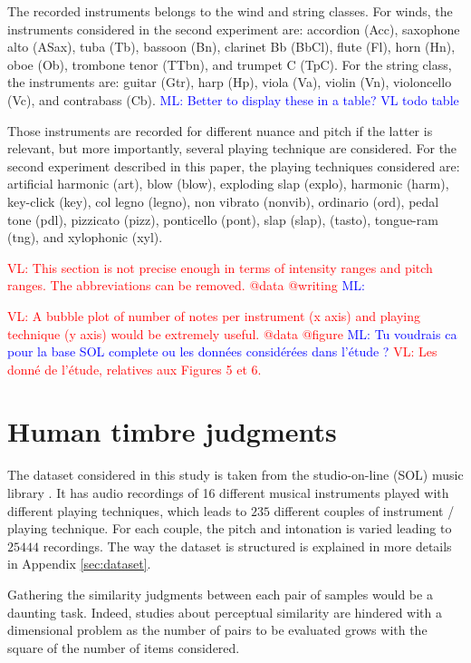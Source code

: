 \documentclass{bmcart}
\newcommand{\ml}[1]{\textcolor{blue}{ML: #1}}
\newcommand{\vl}[1]{\textcolor{red}{VL: #1}}
\begin{document}
\begin{backmatter}
The recorded instruments belongs to the wind and string classes.
For winds, the instruments considered in the second experiment are: accordion (Acc), saxophone alto (ASax), tuba (Tb), bassoon (Bn), clarinet Bb (BbCl), flute (Fl), horn (Hn), oboe (Ob), trombone tenor (TTbn), and trumpet C (TpC).
For the string class, the instruments are: guitar (Gtr), harp (Hp), viola (Va), violin (Vn), violoncello (Vc), and contrabass (Cb).
\ml{Better to display these in a table? VL todo table}

Those instruments are recorded for different nuance and pitch if the latter is relevant, but more importantly, several playing technique are considered.
For the second experiment described in this paper, the playing techniques considered are: artificial harmonic (art), blow (blow), exploding slap (explo), harmonic (harm), key-click (key), col legno (legno), non vibrato (nonvib), ordinario (ord), pedal tone (pdl), pizzicato (pizz), ponticello (pont), slap (slap), (tasto), tongue-ram (tng), and xylophonic (xyl).

\vl{This section is not precise enough in terms of intensity ranges and pitch ranges.
The abbreviations can be removed. @data @writing}
\ml{}

\vl{A bubble plot of number of notes per instrument (x axis) and playing technique
(y axis) would be extremely useful. @data @figure}
\ml{Tu voudrais ca pour la base SOL complete ou les données considérées dans l'étude ?}
\vl{Les donn\'{e} de l'\'{e}tude, relatives aux Figures 5 et 6.}

\section*{Human timbre judgments}
\label{sec:subjective}

The dataset considered in this study is taken
from the studio-on-line (SOL) music library  \cite{peeters2000instrument}.
It has audio recordings of 16 different musical instruments played
with different playing techniques,
which leads to $235$ different couples of instrument / playing technique.
For each couple, the pitch and intonation is varied leading to $25444$ recordings.
The way the dataset is structured
is explained in more details in Appendix \ref{sec:dataset}.

Gathering the similarity judgments between each pair of samples would be a daunting task. Indeed, studies about perceptual similarity are hindered with a dimensional problem as the number of pairs to be evaluated grows with the square of the number of items considered.


\end{backmatter}
\end{document}
